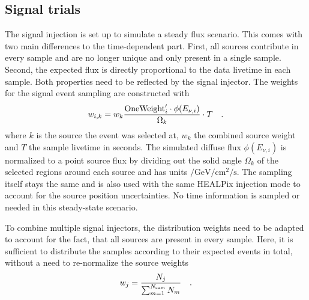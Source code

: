 \subsection*{Signal trials}
The signal injection is set up to simulate a steady flux scenario.
This comes with two main differences to the time-dependent part.
First, all sources contribute in every sample and are no longer unique and only present in a single sample.
Second, the expected flux is directly proportional to the data livetime in each sample.
Both properties need to be reflected by the signal injector.
The weights for the signal event sampling are constructed with
\begin{equation}
  w_{i,k} = w_k \frac{\text{OneWeight}'_i \cdot
    \phi(E_{\nu,i})}{\Omega_k} \cdot T
  \quad\text{.}
\end{equation}
where $k$ is the source the event was selected at, $w_k$ the combined source weight and $T$ the sample livetime in seconds.
The simulated diffuse flux $\phi(E_{\nu,i})$ is normalized to a point source flux by dividing out the solid angle $\Omega_k$ of the selected regions around each source and has units $\si{\per\GeV\per\cm\squared\per\second}$.
The sampling itself stays the same and is also used with the same HEALPix injection mode to account for the source position uncertainties.
No time information is sampled or needed in this steady-state scenario.

To combine multiple signal injectors, the distribution weights need to be adapted to account for the fact, that all sources are present in every sample.
Here, it is sufficient to distribute the samples according to their expected events in total, without a need to re-normalize the source weights
\begin{equation}
  w_j = \frac{N_j}{\sum_{m=1}^{N_\text{sam}}N_m}
  \quad\text{.}
\end{equation}


